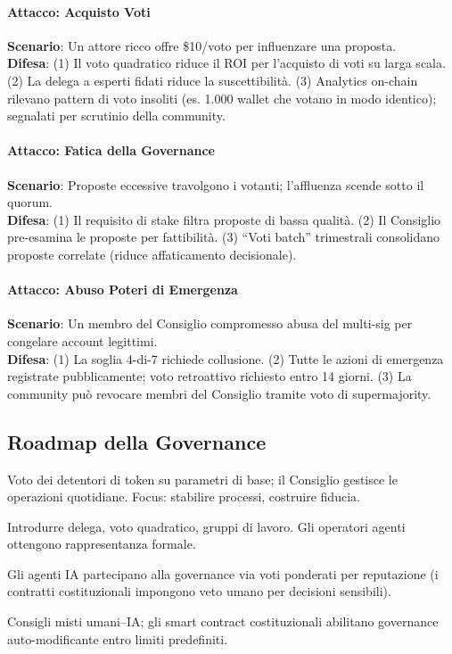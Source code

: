 \documentclass[11pt]{article}
\begin{document}
\begin{itemize}[noitemsep]
\paragraph{Attacco: Acquisto Voti}
\textbf{Scenario}: Un attore ricco offre \$10/voto per influenzare una proposta.\\
\textbf{Difesa}: (1) Il voto quadratico riduce il ROI per l'acquisto di voti su larga scala. (2) La delega a esperti fidati riduce la suscettibilità. (3) Analytics on-chain rilevano pattern di voto insoliti (es. 1.000 wallet che votano in modo identico); segnalati per scrutinio della community.

\paragraph{Attacco: Fatica della Governance}
\textbf{Scenario}: Proposte eccessive travolgono i votanti; l'affluenza scende sotto il quorum.\\
\textbf{Difesa}: (1) Il requisito di stake filtra proposte di bassa qualità. (2) Il Consiglio pre-esamina le proposte per fattibilità. (3) ``Voti batch'' trimestrali consolidano proposte correlate (riduce affaticamento decisionale).

\paragraph{Attacco: Abuso Poteri di Emergenza}
\textbf{Scenario}: Un membro del Consiglio compromesso abusa del multi-sig per congelare account legittimi.\\
\textbf{Difesa}: (1) La soglia 4-di-7 richiede collusione. (2) Tutte le azioni di emergenza registrate pubblicamente; voto retroattivo richiesto entro 14 giorni. (3) La community può revocare membri del Consiglio tramite voto di supermajority.

\subsection{Roadmap della Governance}

\begin{description}[style=nextline]
  \item[Fase 1 (v3.0--v3.5, Early MERCURY)] Voto dei detentori di token su parametri di base; il Consiglio gestisce le operazioni quotidiane. Focus: stabilire processi, costruire fiducia.
  \item[Fase 2 (v4.0, Mid-MERCURY)] Introdurre delega, voto quadratico, gruppi di lavoro. Gli operatori agenti ottengono rappresentanza formale.
  \item[Fase 3 (v5.0, Late MERCURY)] Gli agenti IA partecipano alla governance via voti ponderati per reputazione (i contratti costituzionali impongono veto umano per decisioni sensibili).
  \item[Fase 4 (VENUS+)] Consigli misti umani--IA; gli smart contract costituzionali abilitano governance auto-modificante entro limiti predefiniti.
\end{description}


\end{itemize}
\end{document}
